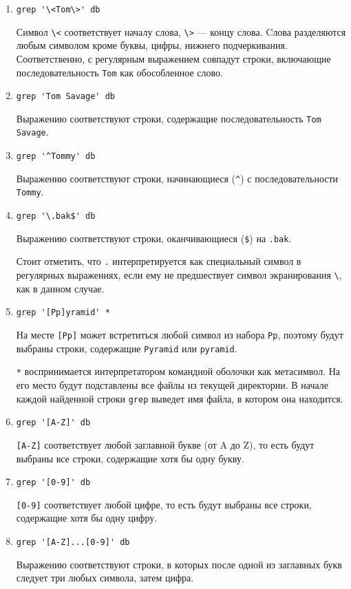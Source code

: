 \documentclass[listings]{labreport}
\begin{document}
\begin{enumerate}
\item \verb|grep '\<Tom\>' db|

Символ \verb|\<| соответствует началу слова, \verb|\>| — концу слова.
Cлова разделяются любым символом кроме буквы, цифры, нижнего подчеркивания.
Соответственно, с регулярным выражением совпадут строки, включающие последовательность \texttt{Tom}
как обособленное слово.

\item \verb|grep 'Tom Savage' db|

Выражению соответствуют строки, содержащие последовательность \texttt{Tom Savage}.

\item \verb|grep '^Tommy' db|

Выражению соответствуют строки, начинающиеся (\verb|^|) с последовательности \texttt{Tommy}.

\item \verb|grep '\.bak$' db|

Выражению соответствуют строки, оканчивающиеся (\verb|$|) на \texttt{.bak}.

Стоит отметить, что \verb|.| интерпретируется как специальный символ в регулярных выражениях,
если ему не предшествует символ экранирования \verb|\|, как в данном случае.

\item \verb|grep '[Pp]yramid' *|

На месте \verb|[Pp]| может встретиться любой символ из набора \texttt{Pp}, поэтому
будут выбраны строки, содержащие \texttt{Pyramid} или \texttt{pyramid}.

\texttt{*} воспринимается интерпретатором командной оболочки как метасимвол. На его
место будут подставлены все файлы из текущей директории. В начале каждой найденной строки
\texttt{grep} выведет имя файла, в котором она находится.

\item \verb|grep '[A-Z]' db|

\verb|[A-Z]| соответствует любой заглавной букве (от A до Z), то есть будут выбраны все
строки, содержащие хотя бы одну букву.

\item \verb|grep '[0-9]' db|

\verb|[0-9]| соответствует любой цифре, то есть будут выбраны все строки, содержащие хотя бы одну цифру.

\item \verb|grep '[A-Z]...[0-9]' db|

Выражению соответствуют строки, в которых после одной из заглавных букв следует три любых символа,
затем цифра.

\end{enumerate}
\end{document}
